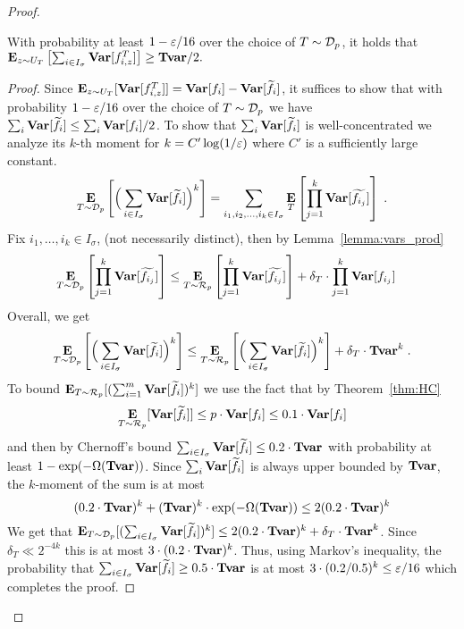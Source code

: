 \begin{proof}
\begin{claim}\label{claim:preserve_var}
With probability at least $1-\varepsilon/16$ over the choice of  $T \sim {\mathcal{D}}_p$, it holds that $\mathop{\bf E\/}_{z\sim U_T} \left[\sum_{i \in I_{\sigma}}{\mathop{\bf Var\/}[f^T_{i,z}]}\right] \ge \mathbf{{Tvar}}/2.$
\end{claim}
\begin{proof}
Since 
$\mathop{\bf E\/}_{z\sim U_T}[{\mathop{\bf Var\/}}[f^T_{i,z}]] = {\mathop{\bf Var\/}}[f_i] - {\mathop{\bf Var\/}}[\widetilde{f_i}]$, it suffices to show that with probability $1-\varepsilon/16$ over the choice of $T\sim {\mathcal{D}}_p$ we have $\sum_{i} {\mathop{\bf Var\/}}[\widetilde{f_i}] \le \sum_{i} {\mathop{\bf Var\/}}[f_i]/2$.
To show that 
$\sum_{i} {\mathop{\bf Var\/}}[\widetilde{f_i}]$ 
is well-concentrated we analyze its $k$-th moment for $k = C'  \log(1/\varepsilon)$ where $C'$ is a sufficiently large constant.
\begin{align*}
\mathop{\bf E\/}_{T\sim {\mathcal{D}}_p}\left[\Big(\sum_{i \in I_{\sigma}} {\mathop{\bf Var\/}}[\widetilde{f_i}]\Big)^{k}\right]
= \sum_{i_1, i_2, \ldots, i_{k}\in I_{\sigma}} \mathop{\bf E\/}_{T}\left[\prod_{j=1}^{k} 	{\mathop{\bf Var\/}}[\widetilde{f_{i_j}}]\right]\;.
\end{align*}
Fix $i_1, \ldots, i_k \in I_{\sigma}$, (not necessarily distinct), then by Lemma~\ref{lemma:vars_prod}
\begin{align*}
\mathop{\bf E\/}_{T\sim {\mathcal{D}}_p}\left[\prod_{j=1}^{k} 	{\mathop{\bf Var\/}}[\widetilde{f_{i_j}}]\right] &\le   \mathop{\bf E\/}_{T\sim \mathcal{R}_p}\left[\prod_{j=1}^{k} 	{\mathop{\bf Var\/}}[\widetilde{f_{i_j}}]\right] + \delta_T	\cdot \prod_{j=1}^{k} 	{\mathop{\bf Var\/}}[f_{i_j}]
\end{align*}
Overall, we get
\begin{align*}\mathop{\bf E\/}_{T\sim {\mathcal{D}}_p}\left[\Big(\sum_{i\in I_{\sigma}} {\mathop{\bf Var\/}}[\widetilde{f_i}]\Big)^{k}\right] \le  \mathop{\bf E\/}_{T\sim \mathcal{R}_p}\left[\Big(\sum_{i\in I_{\sigma}} {\mathop{\bf Var\/}}[\widetilde{f_i}]\Big)^{k}\right] + \delta_T \cdot \mathbf{{Tvar}}^{k}\;.
\end{align*}
To bound $\mathop{\bf E\/}_{T\sim \mathcal{R}_p}[(\sum_{i=1}^{m} {\mathop{\bf Var\/}}[\widetilde{f_i}])^{k}]$
we use the fact that by Theorem~\ref{thm:HC} 
$$\mathop{\bf E\/}_{T \sim \mathcal{R}_p}[{\mathop{\bf Var\/}}[\widetilde{f_i}]] \le p \cdot {\mathop{\bf Var\/}}[f_i] \le 0.1 \cdot {\mathop{\bf Var\/}}[f_i]$$
and then by Chernoff's bound 
$\sum_{i\in I_{\sigma}} {\mathop{\bf Var\/}}[\widetilde{f_i}] \le 0.2 \cdot \mathbf{{Tvar}}$ 
with probability at least $1-\exp(-\Omega(\mathbf{{Tvar}}))$.
Since $\sum_{i} {\mathop{\bf Var\/}}[\widetilde{f_i}]$ is always upper bounded by $\mathbf{{Tvar}}$, the $k$-moment of the sum is at most
$$(0.2 \cdot \mathbf{{Tvar}})^{k} + (\mathbf{{Tvar}})^{k} \cdot \exp(-\Omega(\mathbf{{Tvar}})) \le 2(0.2 \cdot \mathbf{{Tvar}})^{k}$$
We get that 
$\mathop{\bf E\/}_{T\sim {\mathcal{D}}_p}[(\sum_{i\in I_{\sigma}} {\mathop{\bf Var\/}}[\widetilde{f_i}])^{k}] \le 2(0.2 \cdot \mathbf{{Tvar}})^{k} + \delta_T \cdot \mathbf{{Tvar}}^{k}$.
Since $\delta_T \ll 2^{-4 k}$ this is at most 
$3\cdot (0.2 \cdot \mathbf{{Tvar}})^{k}$.
Thus, using Markov's inequality, the probability that $ \sum_{i\in I_{\sigma}} {\mathop{\bf Var\/}}[\widetilde{f_i}]  \ge  0.5 \cdot \mathbf{{Tvar}}$ is at most $3\cdot (0.2/0.5)^{k} \le \varepsilon/16$ which completes the proof.
\end{proof}



\end{proof}
